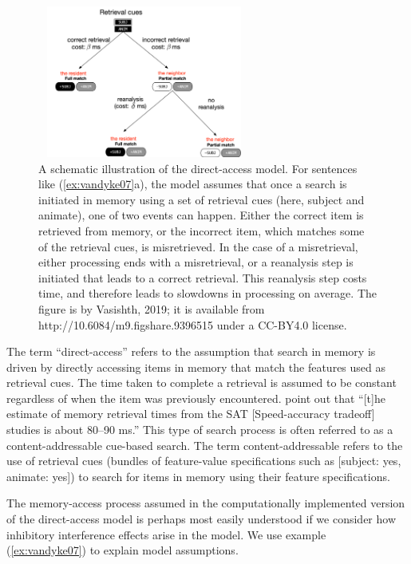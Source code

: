 \documentclass{cambridge7A}\usepackage[]{graphicx}\usepackage[]{color}
\begin{document}
\begin{figure}
\begin{center}
\includegraphics[height=5cm,width=7cm]{figures/c05DA.jpg}
\end{center}
\caption{A schematic illustration of the direct-access model. For sentences like (\ref{ex:vandyke07}a), the model assumes that once a search is initiated in memory using a set of retrieval cues (here, subject and animate), one of two events can happen. Either the correct item is retrieved from memory, or the incorrect item, which matches some of the retrieval cues, is misretrieved. In the case of a misretrieval, either processing ends with a misretrieval, or a reanalysis step is initiated that leads to a correct retrieval. This reanalysis step costs time, and therefore leads to slowdowns in processing on average. The figure is by Vasishth, 2019; it is available from http://10.6084/m9.figshare.9396515 under a CC-BY4.0 license.} \label{fig:da}
\end{figure}

The term ``direct-access'' refers to the assumption that search in memory is driven by directly accessing items in memory that match the features used as retrieval cues. The time taken to complete a retrieval is assumed to be constant regardless of when the item was previously encountered. \cite{LewisVasishthVanDyke2006} point out that  ``[t]he estimate of memory retrieval times from the SAT [Speed-accuracy tradeoff] studies is about 80–90 ms.'' This type of  search process is often referred to as a content-addressable cue-based search. The term content-addressable refers to the use of retrieval cues (bundles of feature-value specifications such as [subject: yes, animate: yes]) to search for items in memory using their feature specifications. 

The memory-access process assumed in the computationally implemented version of the direct-access model \citep{NicenboimRetrieval2018} is perhaps most easily understood if we consider how inhibitory interference effects arise in the model. We use example (\ref{ex:vandyke07}) to explain model assumptions.
\end{document}
